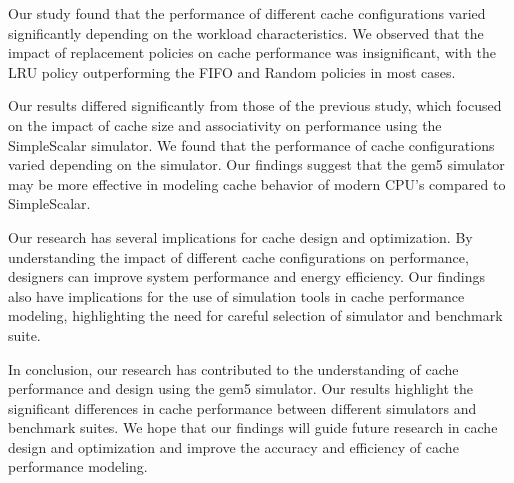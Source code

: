 \documentclass[conference]{IEEEtran}
\begin{document}
Our study found that the performance of different cache configurations varied significantly depending on the workload characteristics. We observed that the impact of replacement policies on cache performance was insignificant, with the LRU policy outperforming the FIFO and Random policies in most cases.

Our results differed significantly from those of the previous study, which focused on the impact of cache size and associativity on performance using the SimpleScalar simulator. We found that the performance of cache configurations varied depending on the simulator. Our findings suggest that the gem5 simulator may be more effective in modeling cache behavior of modern CPU's compared to SimpleScalar.

Our research has several implications for cache design and optimization. By understanding the impact of different cache configurations on performance, designers can improve system performance and energy efficiency. Our findings also have implications for the use of simulation tools in cache performance modeling, highlighting the need for careful selection of simulator and benchmark suite.

In conclusion, our research has contributed to the understanding of cache performance and design using the gem5 simulator. Our results highlight the significant differences in cache performance between different simulators and benchmark suites. We hope that our findings will guide future research in cache design and optimization and improve the accuracy and efficiency of cache performance modeling.

\printbibliography
\end{document}
